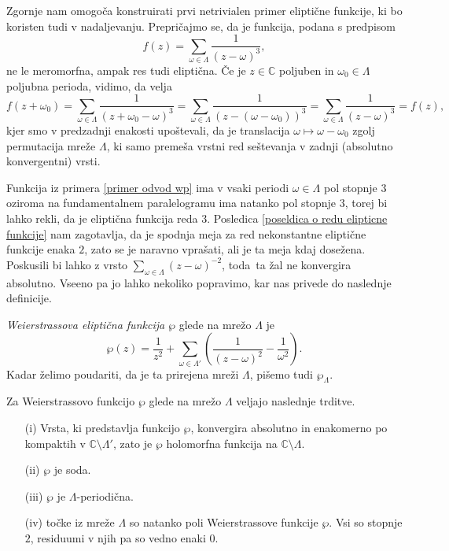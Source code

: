 \documentclass[mat1]{fmfdelo}
\numberwithin{equation}{section}
\newcommand{\C}{\mathbb C}
\newcommand{\om}{\omega}
\theoremstyle{definition}
\begin{document}
\begin{primer*}
    \label{primer odvod wp}
    Zgornje nam omogoča konstruirati prvi netrivialen primer eliptične funkcije, ki bo koristen tudi v nadaljevanju. Prepričajmo se, da je funkcija, podana s predpisom
    \[
        f(z) = \sum_{\om \in \Lambda} \frac{1}{(z - \om)^3},
    \]
    ne le meromorfna, ampak res tudi eliptična. Če je $z \in \C$ poljuben in $\om_0 \in \Lambda$ poljubna perioda, vidimo, da velja
    \[
        f(z + \om_0) = 
        \sum_{\om \in \Lambda} \frac{1}{(z + \om_0 - \om)^3} = 
        \sum_{\om \in \Lambda} \frac{1}{(z - (\om - \om_0))^3} = 
        \sum_{\om \in \Lambda} \frac{1}{(z - \om)^3} = 
        f(z),
    \]
    kjer smo v predzadnji enakosti upoštevali, da je translacija $\om \mapsto \om - \om_0$ zgolj permutacija mreže $\Lambda$, ki samo premeša vrstni red seštevanja v zadnji (absolutno konvergentni) vrsti. 
\end{primer*}

Funkcija iz primera \ref{primer odvod wp} ima v vsaki periodi $\om\in \Lambda$ pol stopnje $3$ oziroma na fundamentalnem paralelogramu ima natanko pol stopnje $3$, torej bi lahko rekli, da je eliptična funkcija reda $3$. Posledica \ref{poseldica o redu elipticne funkcije} nam zagotavlja, da je spodnja meja za red nekonstantne eliptične funkcije enaka $2$, zato se je naravno vprašati, ali je ta meja kdaj dosežena. Poskusili bi lahko z vrsto $\sum_{\om\in\Lambda}(z - \om)^{-2}$, toda ta žal ne konvergira absolutno. Vseeno pa jo lahko nekoliko popravimo, kar nas privede do naslednje definicije. 

\begin{definicija}
    \emph{Weierstrassova eliptična funkcija $\wp$} glede na mrežo $\Lambda$ je
    \[
        \wp(z) = \frac{1}{z^2} + \sum_{\om\in\Lambda'}\left(\frac{1}{(z-\om)^2} - \frac{1}{\om^2}\right).
    \]
    Kadar želimo poudariti, da je ta prirejena mreži $\Lambda$, pišemo tudi $\wp_{\Lambda}$.
\end{definicija}

\begin{trditev}
    \label{lastnosti wp}
    Za Weierstrassovo funkcijo $\wp$ glede na mrežo $\Lambda$ veljajo naslednje trditve.
    \begin{itemize}
        \item[(i)] Vrsta, ki predstavlja funkcijo $\wp$, konvergira absolutno in enakomerno po kompaktih v $\C\setminus\Lambda'$, zato je $\wp$ holomorfna funkcija na $\C \setminus \Lambda$.
        \item[(ii)] $\wp$ je soda.
        \item[(iii)] $\wp$ je $\Lambda$-periodična.
        \item[(iv)] točke iz mreže $\Lambda$ so natanko poli Weierstrassove funkcije $\wp$. Vsi so stopnje $2$, residuumi v njih pa so vedno enaki $0$. 
    \end{itemize}
\end{trditev}
\end{document}
